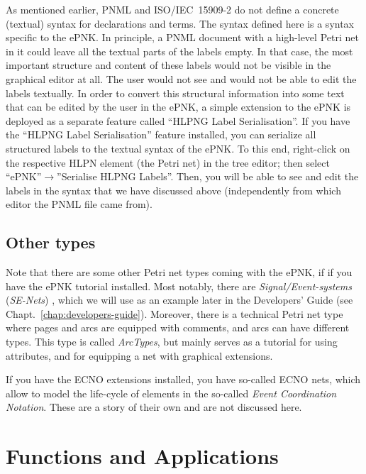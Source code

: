 As mentioned earlier, PNML and ISO/IEC~15909-2 do not define a concrete
(textual) syntax for declarations and terms. The syntax defined here is a syntax
specific to the ePNK. In principle, a PNML document with a high-level Petri net in
it could leave all the textual parts of the labels empty. In that case,
the most important structure and content of these labels would not be
visible in the graphical editor at all. The user would not see and would not
be able to edit the labels textually. In order to convert this structural
information into some text that can be edited by the user in the ePNK, a
simple extension to the ePNK is deployed as a separate feature called ``HLPNG
Label Serialisation''. %
%
If you have the ``HLPNG Label Serialisation'' feature installed, you can
serialize all structured labels to the textual syntax of the ePNK. To this
end, right-click on the respective HLPN element (the Petri net) in the
tree editor; then select ``ePNK''$\rightarrow$''Serialise HLPNG Labels''.%
  \label{sec:user:hlpng:label-serialisation}%
Then, you will be able to see and edit the labels in the syntax that we
have discussed above (independently from which editor the PNML file came from).

\subsection{Other types}

Note that there are some other Petri net types coming with the ePNK, if
if you have the ePNK tutorial installed.  Most notably, there are
\emph{Signal/Event-systems} (\emph{SE-Nets})%
, which we will use as an example later in the Developers' Guide (see
Chapt.~\ref{chap:developers-guide}). Moreover, there is a technical
Petri net type where pages and arcs are equipped with comments, and
arcs can have different types. This type is called \emph{ArcTypes}, but
mainly serves as a tutorial for using attributes, and for equipping
a net with graphical extensions.

If you have the ECNO extensions installed, you have so-called ECNO nets,
which allow to model the life-cycle of elements in the so-called \emph{Event
Coordination Notation}. These are a story of their own \cite{Kin14a} and are not
discussed here.

\section{Functions and Applications}
\label{sec:users-guide:applications}
  

